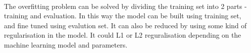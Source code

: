 \documentclass{article}
\begin{document}
\begin{multicols}{2}
\paragraph{} The overfitting problem can be solved by dividing the training set into 2 parts - training and evaluation. In this way the model can be built using training set, and fine tuned using evalution set. It can also be reduced by using some kind of regularisation in the model. It could L1 or L2 reguralisation depending on the machine learning model and parameters.
    
    \nocite{*}
	\begingroup
	\setlength\bibitemsep{10pt}
	\printbibliography
	\endgroup
	
	\end{multicols} 
\end{document}
